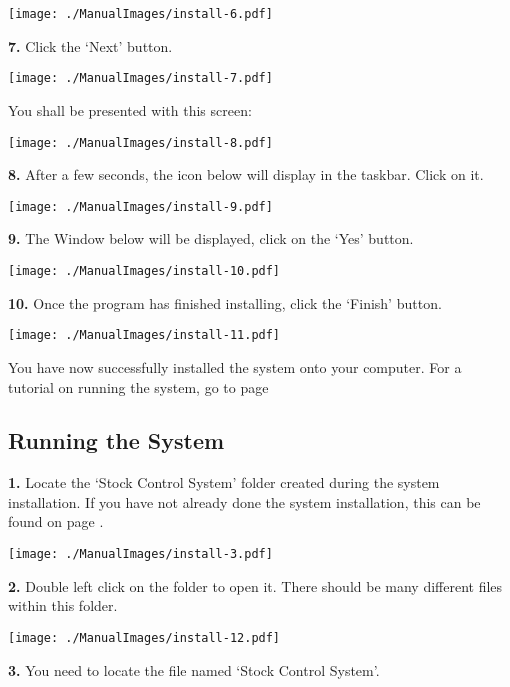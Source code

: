 \texttt{[image: ./ManualImages/install-6.pdf]}

\pagebreak

\textbf{7.} Click the `Next' button.

\texttt{[image: ./ManualImages/install-7.pdf]}

\pagebreak

You shall be presented with this screen:

\texttt{[image: ./ManualImages/install-8.pdf]}

\pagebreak

\textbf{8.} After a few seconds, the icon below will display in the taskbar. Click on it.

\texttt{[image: ./ManualImages/install-9.pdf]}

\pagebreak

\textbf{9.} The Window below will be displayed, click on the `Yes' button.

\texttt{[image: ./ManualImages/install-10.pdf]}

\pagebreak

\textbf{10.} Once the program has finished installing, click the `Finish' button.

\texttt{[image: ./ManualImages/install-11.pdf]}

You have now successfully installed the system onto your computer. For a tutorial on running the system, go to page \pageref{fig:Running the System}

\pagebreak

\subsection{Running the System}
\label{fig:Running the System}

\textbf{1.} Locate the `Stock Control System' folder created during the system installation. If you have not already done the system installation, this can be found on page \pageref{fig:System Installation}.

\texttt{[image: ./ManualImages/install-3.pdf]}

\textbf{2.} Double left click on the folder to open it. There should be many different files within this folder.

\texttt{[image: ./ManualImages/install-12.pdf]}

\textbf{3.} You need to locate the file named `Stock Control System'.

